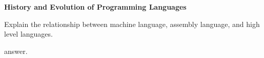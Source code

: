 \textbf{History and Evolution of Programming Languages}

Explain the relationship between machine language, assembly language, and high level languages.
\begin{answer}
answer.
\end{answer}